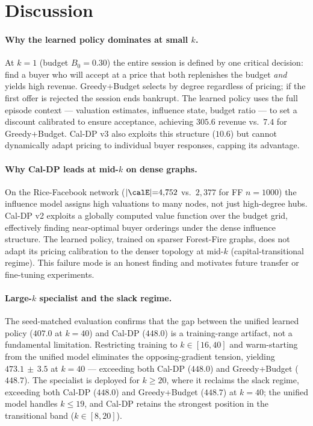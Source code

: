 
\section{Discussion}
\label{sec:discussion}

\paragraph{Why the learned policy dominates at small $k$.}
At $k{=}1$ (budget $B_0{=}0.30$) the entire session is defined by one critical
decision: find a buyer who will accept at a price that both replenishes the budget
\emph{and} yields high revenue.
Greedy+Budget selects by degree regardless of pricing; if the first offer is
rejected the session ends bankrupt.
The learned policy uses the full episode context — valuation estimates, influence
state, budget ratio — to set a discount calibrated to ensure acceptance, achieving
$305.6$ revenue vs.\ $7.4$ for Greedy+Budget. %
Cal-DP v3 also exploits this structure ($10.6$) but cannot dynamically adapt
pricing to individual buyer responses, capping its advantage.

\paragraph{Why Cal-DP leads at mid-$k$ on dense graphs.}
On the Rice-Facebook network ($|\calE|{=}4{,}752$ vs.\ $2{,}377$ for FF $n{=}1000$)
the influence model assigns high valuations to many nodes, not just high-degree
hubs.
Cal-DP v2 exploits a globally computed value function over the budget grid,
effectively finding near-optimal buyer orderings under the dense influence
structure.
The learned policy, trained on sparser Forest-Fire graphs, does not adapt its
pricing calibration to the denser topology at mid-$k$ (capital-transitional
regime).
This failure mode is an honest finding and motivates future transfer or
fine-tuning experiments.

\paragraph{Large-$k$ specialist and the slack regime.}
The seed-matched evaluation confirms that the gap between the unified learned
policy ($407.0$ at $k{=}40$) and Cal-DP ($448.0$) is a training-range artifact,
not a fundamental limitation.
Restricting training to $k \in [16, 40]$ and warm-starting from the unified
model eliminates the opposing-gradient tension, yielding $473.1\,{\pm}\,3.5$
at $k{=}40$ — exceeding both Cal-DP ($448.0$) and Greedy+Budget ($448.7$).
The specialist is deployed for $k{\ge}20$, where it reclaims the slack regime,
exceeding both Cal-DP ($448.0$) and Greedy+Budget ($448.7$) at $k{=}40$;
the unified model handles $k{\le}19$, and Cal-DP retains the strongest position
in the transitional band ($k \in [8, 20]$).

